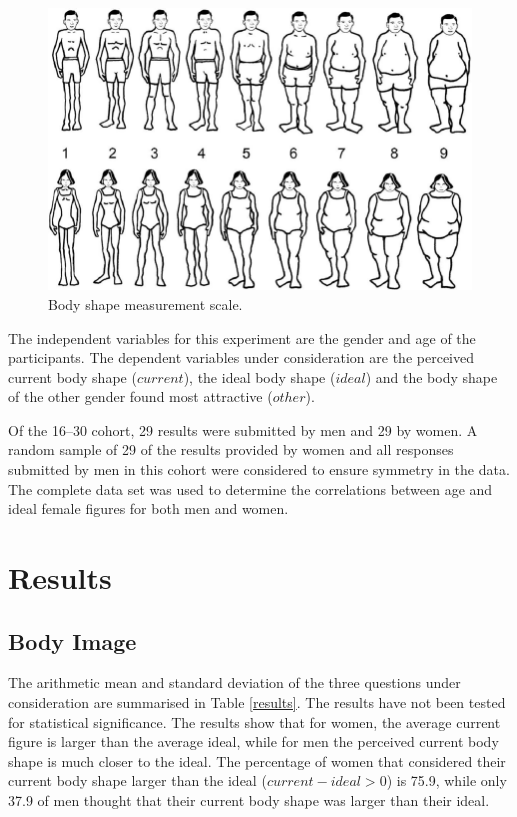 \documentclass[a4paper, apacite, jou, 11pt]{apa6}
\begin{document}
\begin{figure}[htbp]
\centering
\includegraphics[width=.9\linewidth]{BodyScale.png}
\caption{Body shape measurement scale. \label{scale}}
\end{figure}

The independent variables for this experiment are the gender and age of the participants. The dependent variables under consideration are the perceived current body shape (\(current\)), the ideal body shape (\(ideal\)) and the body shape of the other gender found most attractive (\(other\)). 

Of the 16--30 cohort, 29 results were submitted by men and 29 by women. A random sample of 29 of the results provided by women and all responses submitted by men in this cohort were considered to ensure symmetry in the data. The complete data set was used to determine the correlations between age and ideal female figures for both men and women.
\section{Results}
\label{sec:orgcba7d45}
\subsection{Body Image}
\label{sec:org652d51f}
The arithmetic mean and standard deviation of the three questions under consideration are summarised in Table \ref{results}. The results have not been tested for statistical significance. The results show that for women, the average current figure is larger than the average ideal, while for men the perceived current body shape is much closer to the ideal. The percentage of women that considered their current body shape larger than the ideal (\(current-ideal>0\)) is 75.9, while only 37.9 of men thought that their current body shape was larger than their ideal.
\end{document}
